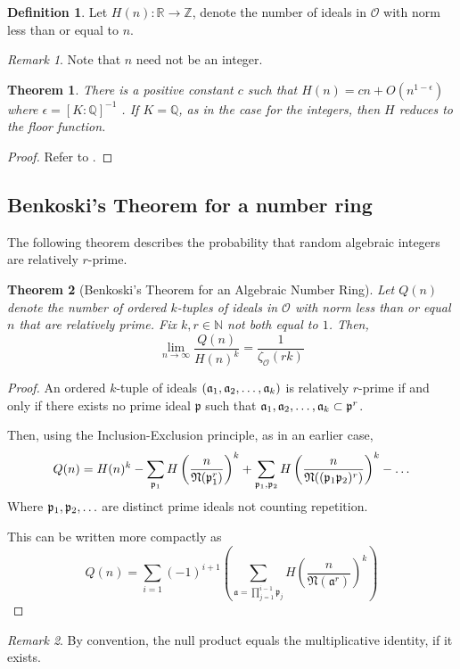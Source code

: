 \documentclass[10pt,a4paper]{article}
\newtheorem{theorem}{Theorem}[section]
\theoremstyle{definition}
\newtheorem{definition}{Definition}[section]
\theoremstyle{remark}
\newtheorem{remark}{Remark}
\newcommand{\f}[1]{\mathfrak{#1}}
\begin{document}
	\begin{definition} \label{H}
		Let \(H(n):\mathbb{R} \to \mathbb{Z}\), denote the number of ideals in \(\mathcal{O}\) with norm less than or equal to \(n\).
	\end{definition}

	\begin{remark}
		Note that \(n\) need not be an integer.
	\end{remark}
	
	\begin{theorem} There is a positive constant \(c\) such that \(H(n)=cn+O(n^{1-\epsilon})\) where \(\epsilon = [K : \mathbb{Q}]^{-1}\) \label{H-estimate}. If \(K=\mathbb{Q}\), as in the case for the integers, then \(H\) reduces to the floor function.
	\end{theorem}
	\begin{proof}
	    Refer to \cite{marcus_number_2012}.
	\end{proof}

\subsection{Benkoski's Theorem for a number ring}

	The following theorem describes the probability that random algebraic integers are relatively \(r\)-prime.
	\begin{theorem}[Benkoski's Theorem for an Algebraic Number Ring]
		Let \(Q(n)\) denote the number of ordered \(k\)-tuples of ideals in \(\mathcal{O}\) with norm less than or equal \(n\) that are relatively prime.
		Fix \(k,r\in\mathbb{N}\) not both equal to \(1\). Then, \[\lim\limits_{n\to\infty}\frac{Q(n)}{H(n)^k}=\frac{1}{\zeta_\mathcal{O}(rk)}\]
	\end{theorem}

	\begin{proof}
		 An ordered \(k\)-tuple of ideals \((\f{a}_1, \f{a}_2, \mathellipsis, \f{a}_k)\) is relatively \(r\)-prime if and only if there exists no prime ideal \(\f{p}\) such that \(\f{a}_1, \f{a}_2,\mathellipsis,\f{a}_k\subset \f{p}^r\).
		
		Then, using the Inclusion-Exclusion principle, as in an earlier case,
		\begin{equation}
			Q(n) = H(n)^k - \sum_{\f{p}_1}H\left(\frac{n}{\f{N}(\f{p}_1^r)}\right)^k+\sum_{\f{p}_1,\f{p}_2}H\left(\frac{n}{\f{N}((\f{p}_1\f{p}_2)^r)}\right)^k-\mathellipsis
		\end{equation}
	Where \(\f{p}_1,\f{p}_2,\mathellipsis\) are distinct prime ideals not counting repetition. 
	
	This can be written more compactly as  
	\begin{equation}
		Q(n)=\sum_{i=1}(-1)^{i+1}\left(\sum_{\f{a}= \prod_{j=1}^{i-1}\f{p}_j}H\left(\frac{n}{\f{N}(\f{a}^r)}\right)^k\right)
	\end{equation}
	\end{proof}
	\begin{remark}
		By convention, the null product equals the multiplicative identity, if it exists. 
	\end{remark}
\end{document}
